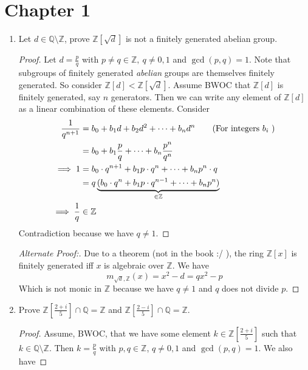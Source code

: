 \documentclass[hidelinks,12pt]{article}
\title{\scalebox{1.45}{Arithmetic Geometry Problems}}
\author{\scalebox{1.5}{Theo Koss}}
\date{October 2024}
\newcommand{\Z}{\mathbb{Z}}
\newcommand{\Q}{\mathbb{Q}}
\begin{document}
\maketitle
\section{Chapter 1}
\begin{enumerate}
    \item Let \(d\in\Q\setminus\Z\), prove \(\Z[\sqrt{d}]\) is not a finitely generated abelian group.
        \begin{proof}
            Let \(d=\frac{p}{q}\) with \(p\neq q\in\Z,\ q\neq0,1\)  and \(\gcd(p,q)=1\). Note that subgroups of finitely generated \emph{abelian} groups are themselves finitely generated. So consider \(\Z[d]<\Z[\sqrt{d}]\). Assume BWOC that \(\Z[d]\) is finitely generated, say \(n\) generators. Then we can write any element of \(\Z[d]\) as a linear combination of these elements. Consider 
            \begin{align*}
                \frac{1}{q^{n+1}}&=b_{0}+b_{1}d+b_{2}d^{2}+\dots+b_{n}d^{n}\tag{For integers \(b_{i}\) }\\
                                 &=b_{0}+b_{1}\frac{p}{q}+\dots+b_{n}\frac{p^{n}}{q^{n}}\\
                \implies 1&=b_{0}\cdot q^{n+1}+b_{1}p\cdot q^{n}+\dots+b_{n}p^{n}\cdot q\\
                          &=q\underbrace{(b_{0}\cdot q^{n}+b_{1}p\cdot q^{n-1}+\dots+b_{n}p^{n})}_{\in\Z}\\
                \implies \frac{1}{q}&\in\Z\\
            \end{align*}
            Contradiction because we have \(q\neq1\).
        \end{proof}
        \begin{proof}[Alternate Proof:]
            Due to a theorem (not in the book :/ ), the ring \(\Z[x]\) is finitely generated iff \(x\) is algebraic over \(\Z\). We have \[
                m_{\sqrt{d},\Z}(x)=x^{2}-d=qx^{2}-p
            \]
            Which is not monic in \(\Z\) because we have \(q\neq1\) and \(q\) does not divide \(p\).
        \end{proof}
    \item Prove \(\Z[\frac{2+i}{5}]\cap\Q=\Z\) and \(\Z[\frac{2-i}{5}]\cap\Q=\Z\).
        \begin{proof}
            Assume, BWOC, that we have some element \(k\in\Z[\frac{2+i}{5}]\) such that \(k\in\Q\setminus\Z\). Then \(k=\frac{p}{q}\) with \(p,q\in\Z\), \(q\neq0,1\) and \(\gcd(p,q)=1\). We also have

\end{proof}
\end{enumerate}
\end{document}
